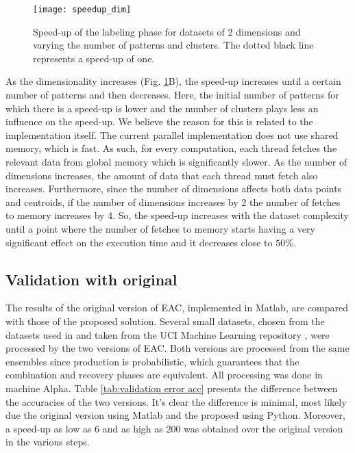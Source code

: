 \begin{figure}[hbtp]
    \centering
    \texttt{[image: speedup\_dim]}
    \caption{Speed-up of the labeling phase for datasets of 2 dimensions and varying the number of patterns and clusters. The dotted black line represents a speed-up of one.}
    \label{fig:kmeans dims}
\end{figure}

As the dimensionality increases (Fig. \ref{fig:kmeans dims}B), the speed-up increases until a certain number of patterns and then decreases.
Here, the initial number of patterns for which there is a speed-up is lower and the number of clusters plays less an influence on the speed-up.
We believe the reason for this is related to the implementation itself.
The current parallel implementation does not use shared memory, which is fast.
As such, for every computation, each thread fetches the relevant data from global memory which is significantly slower.
As the number of dimensions increases, the amount of data that each thread must fetch also increases.
Furthermore, since the number of dimensions affects both data points and centroids, if the number of dimensions increases by 2 the number of fetches to memory increases by 4.
So, the speed-up increases with the dataset complexity until a point where the number of fetches to memory starts having a very significant effect on the execution time and it decreases close to $50\%$.

\subsection{Validation with original}

\noindent The results of the original version of EAC, implemented in Matlab, are compared with those of the proposed solution.
Several small datasets, chosen from the datasets used in \cite{Lourenco2010} and taken from the UCI Machine Learning repository \cite{Lichman:2013}, were processed by the two versions of EAC.
Both versions are processed from the same ensembles since production is probabilistic, which guarantees that the combination and recovery phases are equivalent.
All processing was done in machine Alpha.
Table \ref{tab:validation error acc} presents the difference between the accuracies of the two versions.
It's clear the difference is minimal, most likely due the original version using Matlab and the proposed using Python. 
Moreover, a speed-up as low as 6 and as high as 200 was obtained over the original version in the various steps.%

